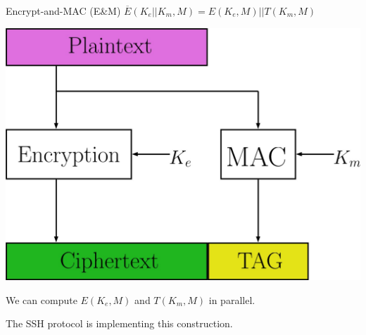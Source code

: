 \documentclass[11pt]{beamer}
\begin{document}
\begin{frame}{Encrypt-and-MAC (E\&M)}
$\overline{E}(K_e||K_m, M) = E(K_e,M)||T(K_m, M)$

\begin{center}
\includegraphics[scale=0.1]{EandM.jpg}
\end{center}

We can compute $E(K_e, M)$ and $T(K_m, M)$ in parallel.

The SSH protocol is implementing this construction.

\end{frame}
\end{document}
